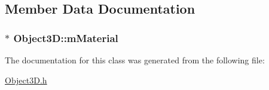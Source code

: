 \subsection{Member Data Documentation}
\hypertarget{classObject3D_a9eb94e46c928f4f90b1d718119bedaf9}{
\subsubsection[{m\+Material}]{$\ast$ Object3\+D\+::m\+Material\hspace{0.3cm}{\ttfamily [protected]}}}\label{classObject3D_a9eb94e46c928f4f90b1d718119bedaf9}


The documentation for this class was generated from the following file\+:\begin{DoxyCompactItemize}
\item 
\hyperlink{Object3D_8h}{Object3\+D.\+h}\end{DoxyCompactItemize}
